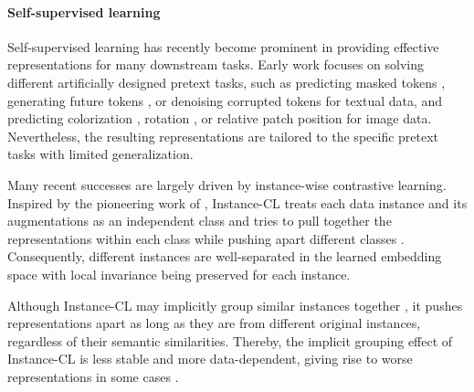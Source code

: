 \documentclass[11pt]{article}
\begin{document}
\paragraph{Self-supervised learning}{
Self-supervised learning has recently become prominent in providing effective representations for many downstream tasks. 
Early work focuses on solving different artificially designed pretext tasks, such as predicting masked tokens \citep{devlin2019bert},
generating future tokens \citep{radford2018improving}, or denoising corrupted tokens \citep{lewis2019bart} for textual data, and predicting colorization \citep{zhang2016colorful}, rotation \citep{gidaris2018unsupervised}, or relative patch position \citep{doersch2015unsupervised} for image data. Nevertheless, the resulting representations are tailored to the 
specific pretext tasks with limited generalization.


Many recent successes are largely driven by instance-wise contrastive learning. Inspired by the pioneering work of \citet{becker1992self,bromley1994signature}, Instance-CL treats each data instance and its augmentations as an independent class and tries to pull together the representations within each class while pushing apart different classes
\citep{dosovitskiy2014discriminative, oord2018representation, bachman2019learning,he2020momentum, chen2020simple, xchen2020improved}. Consequently,  different instances are well-separated in the learned embedding space with local invariance 
being preserved for each instance. 

Although Instance-CL may implicitly group similar instances together \citep{wu2018unsupervised}, it pushes representations apart as long as they are from different original instances, regardless of their semantic similarities. Thereby, the implicit grouping effect of Instance-CL is less stable and more data-dependent, giving rise to worse representations in some cases \citep{khosla2020supervised,li2020prototypical,purushwalkam2020demystifying}.
}   
\end{document}
